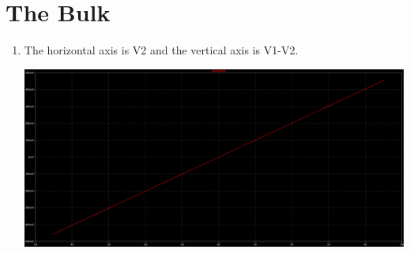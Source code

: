 \documentclass[12pt]{article}
\begin{document}
\section{The Bulk}
\begin{enumerate}
    \item The horizontal axis is V2 and the vertical axis is V1-V2.
    \begin{center}
        \includegraphics[width=\linewidth]{images/B1.png}
    \end{center}


\end{enumerate}
\end{document}
